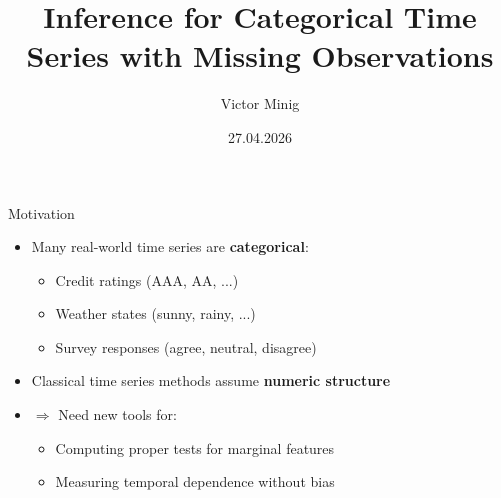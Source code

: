 \documentclass{beamer}
\title{Inference for Categorical Time Series with Missing Observations}
\author{Victor Minig}
\date{27.04.2026}
\begin{document}
\frame{\titlepage}

\begin{frame}{Motivation}
\begin{itemize}
    \item Many real-world time series are \textbf{categorical}:
    \begin{itemize}
        \item Credit ratings (AAA, AA, ...)
        \item Weather states (sunny, rainy, ...)
        \item Survey responses (agree, neutral, disagree)
    \end{itemize}
    
    \vspace{0.3cm}
    
    \item Classical time series methods assume \textbf{numeric structure}
    
    \vspace{0.3cm}
    
    \item $\Rightarrow$ Need new tools for:
    \begin{itemize}
        \item Computing proper tests for marginal features 
        \item Measuring temporal dependence without bias 
    \end{itemize}
\end{itemize}
\end{frame}
\end{document}
